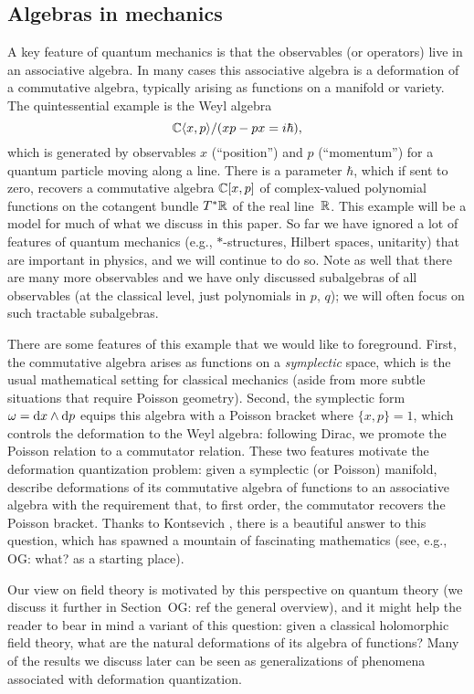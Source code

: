\documentclass[11pt]{amsart}
\def\owen#1{{\textcolor{violet!50!black}{OG: {#1}}}}
\begin{document}
\subsection{Algebras in mechanics}

A key feature of quantum mechanics is that the observables (or operators) live in an associative algebra.
In many cases this associative algebra is a deformation of a commutative algebra, typically arising as functions on a manifold or variety.
The quintessential example is the Weyl algebra
\[
\mathbb C \langle x, p \rangle /(xp - px = i \hbar),
\] 
which is generated by observables $x$ (``position'') and $p$ (``momentum'') for a quantum particle moving along a line.
There is a parameter $\hbar$, which if sent to zero, recovers a commutative algebra $\mathbb C [ x, p ]$ of complex-valued polynomial functions on the cotangent bundle $T^* \mathbb R$ of the real line~$\mathbb R$.
This example will be a model for much of what we discuss in this paper.
So far we have ignored a lot of features of quantum mechanics (e.g., $\ast$-structures, Hilbert spaces, unitarity) that are important in physics,
and we will continue to do so.
Note as well that there are many more observables and we have only discussed subalgebras of all observables (at the classical level, just polynomials in $p$, $q$);
we will often focus on such tractable subalgebras. 

There are some features of this example that we would like to foreground. 
First, the commutative algebra arises as functions on a {\em symplectic} space,
which is the usual mathematical setting for classical mechanics (aside from more subtle situations that require Poisson geometry).
Second, the symplectic form $\omega = {\rm d} x \wedge {\rm d} p$ equips this algebra 
with a Poisson bracket where $\{ x, p \} = 1$,
which controls the deformation to the Weyl algebra: following Dirac, we promote the Poisson relation to a commutator relation.
These two features motivate the deformation quantization problem: 
given a symplectic (or Poisson) manifold,
describe deformations of its commutative algebra of functions to an associative algebra with the requirement that, to first order,  the commutator recovers the Poisson bracket.
Thanks to Kontsevich \cite{KonDQ}, there is a beautiful answer to this question, which has spawned a mountain of fascinating mathematics (see, e.g., \owen{what?} as a starting place).

Our view on field theory is motivated by this perspective on quantum theory (we discuss it further in Section~\owen{ref the general overview}), 
and it might help the reader to bear in mind a variant of this question:
given a classical holomorphic field theory, what are the natural deformations of its algebra of functions?
Many of the results we discuss later can be seen as generalizations of phenomena associated with deformation quantization.
\end{document}
